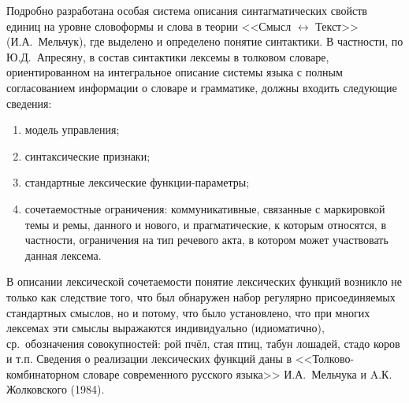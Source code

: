\documentclass[12pt]{article}
\theoremstyle{definition}
\theoremstyle{remark}
\numberwithin{equation}{section}
\begin{document}
Подробно разработана особая система описания синтагматических свойств единиц на уровне словоформы и слова в теории <<Смысл $\leftrightarrow$ Текст>> (И.А.~Мельчук), где выделено и определено понятие синтактики. В частности, по Ю.Д.~Апресяну, в состав синтактики лексемы в толковом словаре, ориентированном на интегральное описание системы языка с полным согласованием информации о словаре и грамматике, должны входить следующие сведения:
\begin{enumerate}
	\item модель управления;
	\item синтаксические признаки;
	\item стандартные лексические функции\nobreakdash-параметры;
	\item сочетаемостные ограничения: коммуникативные, связанные с маркировкой темы и ремы, данного и нового, и прагматические, к которым относятся, в частности, ограничения на тип речевого акта, в котором может участвовать данная лексема.
\end{enumerate}

В описании лексической сочетаемости понятие лексических функций возникло не только как следствие того, что был обнаружен набор регулярно присоединяемых стандартных смыслов, но и потому, что было установлено, что при многих лексемах эти смыслы выражаются индивидуально (идиоматично), ср.~обозначения совокупностей: рой пчёл, стая птиц, табун лошадей, стадо коров и т.п. Сведения о реализации лексических функций даны в <<Толково-комбинаторном словаре современного русского     языка>> И.А.~Мельчука и A.К. Жолковского (1984).
\end{document}

